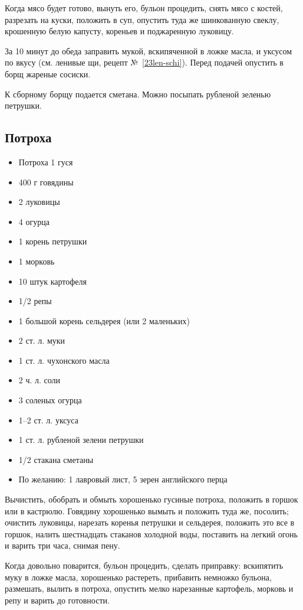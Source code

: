 Когда мясо будет готово, вынуть его, бульон процедить, снять мясо с костей, разрезать на куски, положить в суп, опустить туда же шинкованную свеклу, крошенную белую капусту, кореньев и поджаренную луковицу.

За 10 минут до обеда заправить мукой, вскипяченной в ложке масла, и уксусом по вкусу (см. ленивые щи, рецепт №~\ref{23len-schi}). Перед подачей опустить в борщ жареные сосиски.

К сборному борщу подается сметана. Можно посыпать рубленой зеленью петрушки.

\subsection{Потроха}\label{33potroha}

\begin{itemize}
	\item Потроха 1 гуся
    \item 400 г говядины
    \item 2 луковицы 
    \item 4 огурца 
    \item 1 корень петрушки
    \item 1 морковь
    \item 10 штук картофеля
    \item 1/2 репы
    \item 1 большой корень сельдерея (или 2 маленьких) 
    \item 2 ст. л. муки 
    \item 1 ст. л. чухонского масла
    \item 2 ч. л. соли 
    \item 3 соленых огурца
    \item 1–2 ст. л. уксуса
    \item 1 ст. л. рубленой зелени петрушки
    \item 1/2 стакана сметаны
    \item По желанию: 1 лавровый лист, 5 зерен английского перца
\end{itemize}

Вычистить, обобрать и обмыть хорошенько гусиные потроха, положить в горшок или в кастрюлю. Говядину хорошенько вымыть и положить туда же, посолить; очистить луковицы, нарезать коренья петрушки и сельдерея, положить это все в горшок, налить шестнадцать стаканов холодной воды, поставить на легкий огонь и варить три часа, снимая пену.

Когда довольно поварится, бульон процедить, сделать приправку: вскипятить муку в ложке масла, хорошенько растереть, прибавить немножко бульона, размешать, вылить в потроха, опустить мелко нарезанные картофель, морковь и репу и варить до готовности.

